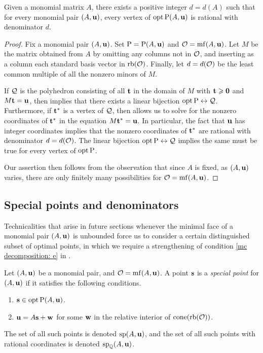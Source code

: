 \documentclass[11pt]{amsart}
\newcommand{\denom}{d} %
\begin{document}
\begin{theorem}
\label{uniform denominators for vertices:  T}
Given a monomial matrix $A$, there exists a positive integer $\denom = \denom(A)$ such that for every monomial pair $(A, \mathbf{u})$, every vertex of $\operatorname{opt} \mathrm{P}(A, \mathbf{u})$ is rational with denominator $\denom$.
\end{theorem}

\begin{proof}
Fix a monomial pair $(A, \mathbf{u})$. Set $\mathrm{P} = \mathrm{P}(A, \mathbf{u})$ and $\mathcal{O} = \operatorname{mf}(A, \mathbf{u})$.  Let $M$ be the matrix obtained from $A$ by omitting any columns not in $\mathcal{O}$, and inserting as a column each standard basis vector in $\operatorname{rb}(\mathcal{O})$.  Finally, let $\denom = \denom(\O)$ be the least common multiple of all the nonzero minors of $M$.

If $\mathcal{Q}$ is the polyhedron consisting of all $\mathbf{t}$ in the domain of $M$ with $\mathbf{t} \geqslant \mathbf{0}$ and $M \mathbf{t} = \mathbf{u}$, then  implies that there exists a linear bijection $\operatorname{opt} \mathrm{P}
\leftrightarrow \mathcal{Q}$.  Furthermore, if $\mathbf{t}^{\ast}$ is a vertex of $\mathcal{Q}$, then  allows us to solve for the nonzero coordinates of $\mathbf{t}^{\ast}$ in the equation $M \mathbf{t}^{\ast} = \mathbf{u}$.  In particular, the fact that $\mathbf{u}$ has integer coordinates implies that the nonzero coordinates of $\mathbf{t}^{\ast}$ are rational with denominator $\denom = \denom(\O)$.  The linear bijection $\operatorname{opt} \mathrm{P} \leftrightarrow \mathcal{Q}$ implies the same must be true for every vertex of $\operatorname{opt} \mathrm{P}$.

Our assertion then follows from the observation that since $A$ is fixed, as $(A, \mathbf{u})$ varies, there are only finitely many possibilities for $\mathcal{O} = \operatorname{mf}(A, \mathbf{u})$.
\end{proof}

\subsection{Special points and denominators}

Technicalities that arise in future sections whenever the minimal face of a monomial pair $(A, \mathbf{u})$ is unbounded force us to consider a certain distinguished subset of optimal points, in which we require a strengthening of condition \eqref{mc decomposition: e} in .

\begin{definition}
\label{mc: D}
Let $(A,\mathbf{u})$ be a monomial pair, and $\mathcal{O} = \operatorname{mf}(A, \mathbf{u})$.  A point $\mathbf{s}$ is a \emph{special point} for $(A, \mathbf{u})$ if it satisfies the following conditions.
\begin{enumerate}
\item $\mathbf{s} \in \operatorname{opt} \mathrm{P}(A, \mathbf{u})$.
\item $\mathbf{u} = A \mathbf{s} + \mathbf{w}$ for some $\mathbf{w}$ in the relative interior of $\operatorname{cone} ( \operatorname{rb}(\mathcal{O}))$.
\end{enumerate}
The set of all such points is denoted $\operatorname{sp}(A, \mathbf{u})$, and the set of all such points with rational coordinates is denoted $\operatorname{sp}_{\mathbb{Q}}(A, \mathbf{u})$.
\end{definition}
\end{document}
